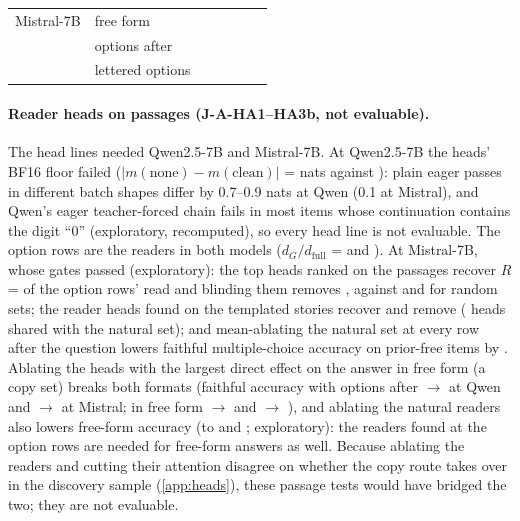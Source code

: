 \begin{table}[!ht]
\begin{tabular}{@{}llccccc@{}}
\addlinespace[2pt]
Mistral-7B & free form & \JaKiviNoneNomMistralSeven{} & \JaKiviKtwoNomMistralSeven{} & \JaKiviVtwoNomMistralSeven{} & \JaKiviErrKNomMistralSeven{} & \JaKiviErrVNomMistralSeven{} \\
 & options after & \JaKiviNoneOptaMistralSeven{} & \JaKiviKtwoOptaMistralSeven{} & \JaKiviVtwoOptaMistralSeven{} & \JaKiviErrKOptaMistralSeven{} & \JaKiviErrVOptaMistralSeven{} \\
 & lettered options & \JaKiviNoneLetaMistralSeven{} & \JaKiviKtwoLetaMistralSeven{} & \JaKiviVtwoLetaMistralSeven{} & \JaKiviErrKLetaMistralSeven{} & \JaKiviErrVLetaMistralSeven{} \\
\bottomrule
\end{tabular}
\end{table}

\paragraph{Reader heads on passages (J-A-HA1--HA3b, not evaluable).} The head lines needed Qwen2.5-7B and Mistral-7B. At Qwen2.5-7B the heads' BF16 floor failed ($\lvert m(\text{none}) - m(\text{clean})\rvert$ = \JaHaGoneNoneCleanQwenSeven{} nats against \JaHaGoneBoundQwenSeven{}): plain eager passes in different batch shapes differ by 0.7--0.9 nats at Qwen (0.1 at Mistral), and Qwen's eager teacher-forced chain fails in most items whose continuation contains the digit ``0'' (exploratory, recomputed), so every head line is not evaluable. The option rows are the readers in both models ($d_G/d_{\mathrm{full}}$ = \JaHaGtwoRatioQwenSeven{} and \JaHaGtwoRatioMistralSeven{}). At Mistral-7B, whose gates passed (exploratory): the top \JaHaKstarMistralSeven{} heads ranked on the passages recover $R$ = \JaHaOneRMistralSeven{} of the option rows' read and blinding them removes \JaHaOneKOMistralSeven{}, against \JaHaOneRrandMistralSeven{} and \JaHaOneKOrandMistralSeven{} for random sets; the reader heads found on the templated stories recover \JaHaTwoRMistralSeven{} and remove \JaHaTwoKOMistralSeven{} (\JaHaTwoOverlapMistralSeven{} heads shared with the natural set); and mean-ablating the natural set at every row after the question lowers faithful multiple-choice accuracy on prior-free items by \JaHaThreeaDropMistralSeven{}. Ablating the heads with the largest direct effect on the answer in free form (a copy set) breaks both formats (faithful accuracy with options after \JaAblFaithNoneOptaQwenSeven{} $\to$ \JaAblFaithCstarOptaQwenSeven{} at Qwen and \JaAblFaithNoneOptaMistralSeven{} $\to$ \JaAblFaithCstarOptaMistralSeven{} at Mistral; in free form \JaAblFaithNoneNomQwenSeven{} $\to$ \JaAblFaithCstarNomQwenSeven{} and \JaAblFaithNoneNomMistralSeven{} $\to$ \JaAblFaithCstarNomMistralSeven{}), and ablating the natural readers also lowers free-form accuracy (to \JaAblFaithNstarNomQwenSeven{} and \JaAblFaithNstarNomMistralSeven{}; exploratory): the readers found at the option rows are needed for free-form answers as well. Because ablating the readers and cutting their attention disagree on whether the copy route takes over in the discovery sample (\cref{app:heads}), these passage tests would have bridged the two; they are not evaluable. %

